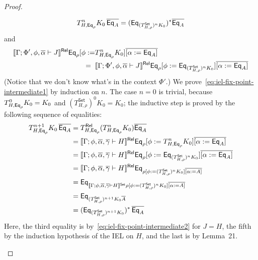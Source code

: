 \documentclass[acmsmall,review,anonymous]{acmart}
\theoremstyle{definition}
\newcommand{\set}{\mathsf{Set}}
\begin{document}
\begin{proof}
\begin{itemize}
\begin{equation}\label{eq:iel-fix-point-intermediate1}
T^n_{H, \Eq_{\rho}} K_0\, \ol{\Eq_A} = (\Eq_{(T^\set_{H, \rho})^n K_0})^*
\ol{\Eq_A}
\end{equation}
and 
\begin{equation}\label{eq:iel-fix-point-intermediate2}
\begin{split}
  \relsem{\Gamma; \Phi', \phi, \ol{\alpha} \vdash J}
\Eq_{\rho} [\phi := 
 & T^{n}_{H,\Eq_{\rho}} K_0] \overline{[\alpha :=
    \Eq_A]} \\
=\;\; & \relsem{\Gamma; \Phi', \phi, \ol{\alpha} \vdash J} \Eq_{\rho} [\phi
  := \Eq_{(T^\set_{H,\rho})^n K_0}] \overline{[\alpha :=
    \Eq_A]}
\end{split}
\end{equation}
(Notice that we don't know what's in the context $\Phi'$.)
We prove~\eqref{eq:iel-fix-point-intermediate1} by induction on $n$.
The case $n=0$ is trivial, because $T^0_{H,\mathsf{Eq}_{\rho}} K_0 = K_0$ and
$(T^\set_{H,\rho})^0 K_0 = K_0$; the inductive step is proved by the
following sequence of equalities:
\[
\begin{split}
T^{n+1}_{H,\Eq_{\rho}} K_0\, \overline{\Eq_A}
&= T^\rel_{H,\Eq_{\rho}} (T^{n}_{H,\Eq_{\rho}} K_0)
\overline{\Eq_A} \\ 
&= \relsem{\Gamma; \phi, \ol{\alpha}, \ol\gamma \vdash H} \Eq_{\rho} [\phi
  := T^{n}_{H, \Eq_{\rho}} K_0] \overline{[\alpha :=
    \Eq_A]} \\ 
&= \relsem{\Gamma; \phi, \ol{\alpha}, \ol\gamma \vdash H} \Eq_{\rho} [\phi
  := \Eq_{(T^\set_{H,\rho})^n K_0}] \overline{[\alpha :=
    \Eq_A]} \\ 
&= \relsem{\Gamma; \phi, \ol{\alpha}, \ol\gamma \vdash H} \Eq_{\rho [\phi
    := (T^\set_{H,\rho})^n K_0] \overline{[\alpha :=
      A]}} \\ 
&= \Eq_{\setsem{\Gamma; \phi, \ol{\alpha}, \ol\gamma \vdash H} \rho [\phi
    := (T^\set_{H,\rho})^n K_0] \overline{[\alpha :=
      A]}} \\ 
&= \Eq_{(T^\set_{H,\rho})^{n+1} K_0 \overline{A}} \\ 
&= (\Eq_{(T^\set_{H,\rho})^{n+1} K_0})^*\, \overline{\Eq_A} 
\end{split}
\]
Here, the third equality is by~\eqref{eq:iel-fix-point-intermediate2}
for $J = H$, the fifth by the induction hypothesis of the IEL on $H$,
and the last is by Lemma~21.

\vspace*{0.1in}


\end{itemize}
\end{proof}
\end{document}
